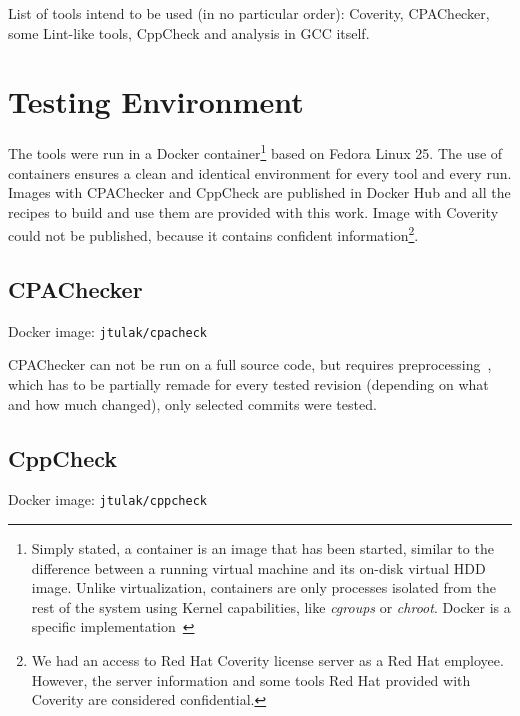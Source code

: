 List of tools intend to be used (in no particular order): Coverity,
	CPAChecker, some Lint-like tools, CppCheck and analysis in GCC itself.


\section{Testing Environment}\label{chap:techniques:env}

The tools were run in a Docker container\footnote{Simply stated, a
	container is an image that has been started, similar to the
		difference between a running virtual machine and its
		on-disk virtual HDD image. Unlike virtualization,
		containers are only processes isolated from the rest of the
system using Kernel capabilities, like {\em cgroups} or {\em chroot}.
Docker is a specific implementation~\cite{docker}} based on Fedora Linux
25. The use of containers ensures a clean and identical environment for
every tool and every run. Images with CPAChecker and CppCheck are published
in Docker Hub and all the recipes to build and use them are provided with
this work. Image with Coverity could not be published, because it contains
confident information\footnote{We had an access to Red Hat Coverity license
server as a Red Hat employee. However, the server information and some tools
	Red Hat provided with Coverity are considered confidential. }.

\subsection{CPAChecker}
Docker image: {\tt jtulak/cpacheck}~\cite{dockerCPAChecker}

CPAChecker can not be run on a full source code, but requires
preprocessing~\cite{cpacheckerGettingStarted}, which has to be partially
remade for every tested revision (depending on what and how much changed),
       only selected commits were tested.
\subsection{CppCheck}
Docker image: {\tt jtulak/cppcheck}~\cite{dockerCPPCheck}

